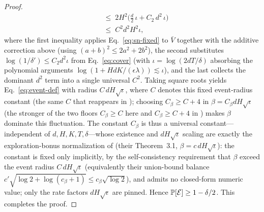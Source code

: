 \begin{proof}
\begin{align*}
&\;\le\; 2H^2\Big( \tfrac{d}{2}\,\iota + C_2\, d^2\,\iota \Big) \\
&\;\le\; C^2 d^2 H^2 \iota,
\end{align*}
where the first inequality applies Eq.~\eqref{eq:sn-fixed} to $\bar V$ together
with the additive correction above (using $(a+b)^2\le2a^2+2b^2$), the second
substitutes
$\log(1/\delta')\le C_2 d^2\iota$ from Eq.~\eqref{eq:cover} (with $\iota=
\log(2dT/\delta)$ absorbing the polynomial arguments $\log(1+HdK/(\epsilon
\lambda))\lesssim\iota$), and the last collects the dominant $d^2$ term into a
single universal $C^2$. Taking square roots yields Eq.~\eqref{eq:event-def} with
radius $C\,dH\sqrt{\iota}$, where $C$ denotes this fixed event-radius constant
(the same $C$ that reappears in ); choosing $C_\beta\ge C+4$
in $\beta=C_\beta dH\sqrt{\iota}$ (the stronger of the two floors $C_\beta\ge C$
here and $C_\beta\ge C+4$ in ) makes $\beta$ dominate this
fluctuation. The constant $C_\beta$ is thus a universal constant---independent of
$d,H,K,T,\delta$---whose existence and $dH\sqrt{\iota}$ scaling are exactly the
exploration-bonus normalization of \cite{jin2020provably} (their Theorem~3.1,
$\beta=c\,dH\sqrt{\iota}$): the constant is fixed only implicitly, by the
self-consistency requirement that $\beta$ exceed the event radius $C\,dH\sqrt{\iota}$
(equivalently their union-bound balance $c'\sqrt{\log 2+\log(c_\beta+1)}\le
c_\beta\sqrt{\log 2}$), and admits no closed-form numeric value; only the rate
factors $dH\sqrt{\iota}$ are pinned. Hence $\mathbb{P}[\mathcal{E}]\ge 1-\delta/2$. This
completes the proof.
\end{proof}
